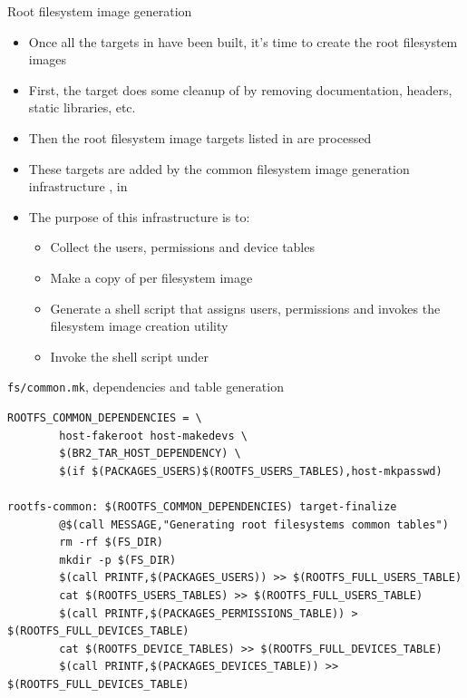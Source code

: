 \begin{frame}{Root filesystem image generation}
  \begin{itemize}
  \item Once all the targets in  have been built,
    it's time to create the root filesystem images
  \item First, the  target does some cleanup of
     by removing documentation, headers, static
    libraries, etc.
  \item Then the root filesystem image targets listed in
     are processed
  \item These targets are added by the common filesystem image
    generation infrastructure , in 
  \item The purpose of this infrastructure is to:
    \begin{itemize}
    \item Collect the users, permissions and device tables
    \item Make a copy of  per filesystem image
    \item Generate a shell script that assigns users, permissions and
      invokes the filesystem image creation utility
    \item Invoke the shell script under 
    \end{itemize}
  \end{itemize}
\end{frame}

\begin{frame}[fragile]{{\tt fs/common.mk}, dependencies and table generation}
  \begin{block}{}
\begin{verbatim}
ROOTFS_COMMON_DEPENDENCIES = \
        host-fakeroot host-makedevs \
        $(BR2_TAR_HOST_DEPENDENCY) \
        $(if $(PACKAGES_USERS)$(ROOTFS_USERS_TABLES),host-mkpasswd)

rootfs-common: $(ROOTFS_COMMON_DEPENDENCIES) target-finalize
        @$(call MESSAGE,"Generating root filesystems common tables")
        rm -rf $(FS_DIR)
        mkdir -p $(FS_DIR)
        $(call PRINTF,$(PACKAGES_USERS)) >> $(ROOTFS_FULL_USERS_TABLE)
        cat $(ROOTFS_USERS_TABLES) >> $(ROOTFS_FULL_USERS_TABLE)
        $(call PRINTF,$(PACKAGES_PERMISSIONS_TABLE)) > $(ROOTFS_FULL_DEVICES_TABLE)
        cat $(ROOTFS_DEVICE_TABLES) >> $(ROOTFS_FULL_DEVICES_TABLE)
        $(call PRINTF,$(PACKAGES_DEVICES_TABLE)) >> $(ROOTFS_FULL_DEVICES_TABLE)
\end{verbatim}
  \end{block}
\end{frame}

